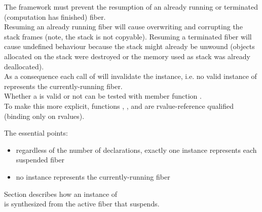 \label{invalidation}

The framework must prevent the resumption of an already running or terminated
(computation has finished) fiber.\\
Resuming an already running fiber will cause overwriting and corrupting the stack
frames (note, the stack is not copyable).  Resuming a terminated fiber will
cause undefined behaviour because the stack might already be unwound (objects
allocated on the stack were destroyed or the memory used as stack was already
deallocated).\\
As a consequence each call of \resume will invalidate the \fiber instance, i.e.
no valid instance of \fiber represents the currently-running fiber.\\
Whether a \fiber is valid or not can be tested with member function \opbool.\\
To make this more explicit, functions \resume, \resumewith, \xtresume
and \xtresumewith are rvalue-reference qualified (binding only on rvalues).

The essential points:
\begin{itemize}
    \item regardless of the number of \fiber declarations, exactly one \fiber
          instance represents each suspended fiber
    \item no \fiber instance represents the currently-running fiber
\end{itemize}

Section  describes how an instance of\\
\fiber is synthesized from the active fiber that suspends.\\

